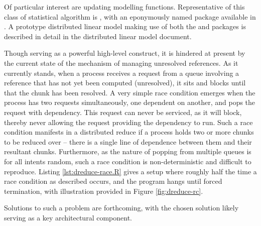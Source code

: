 \documentclass[10pt, a4paper]{article}
\begin{document}
Of particular interest are updating modelling functions.
Representative of this class of statistical algorithm is , with an eponymously named package available in \R{}.
A prototype distributed linear model making use of both the  and \lsr{} packages is described in detail in the distributed linear model document.

Though serving as a powerful high-level construct, it is hindered at present by the current state of the \lsr{} mechanism of managing unresolved references.
As it currently stands, when a process receives a request from a queue involving a reference that has not yet been computed (unresolved), it sits and blocks until that the chunk has been resolved.
A very simple race condition emerges when the process has two requests simultaneously, one dependent on another, and pops the request with dependency.
This request can never be serviced, as it will block, thereby never allowing the request providing the dependency to run.
Such a race condition manifests in a distributed reduce if a process holds two or more chunks to be reduced over -- there is a single line of dependence between them and their resultant chunks.
Furthermore, as the nature of popping from multiple queues is for all intents random, such a race condition is non-deterministic and difficult to reproduce.
Listing \ref{lst:dreduce-race.R} gives a setup where roughly half the time a race condition as described occurs, and the program hangs until forced termination, with illustration provided in Figure \ref{fig:dreduce-rc}.

Solutions to such a problem are forthcoming, with the chosen solution likely serving as a key architectural component.
\end{document}
